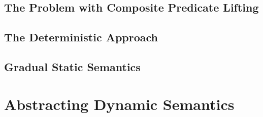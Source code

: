 \subsection{The Problem with Composite Predicate Lifting}
\label{ssec:the-problem-with}

\subsection{The Deterministic Approach}
\label{ssec:the-deterministic-approach}

%        
%        
\subsection{Gradual Static Semantics}
\label{sec:gradualize-hoare-rules}


\section{Abstracting Dynamic Semantics}

%

%

%    

